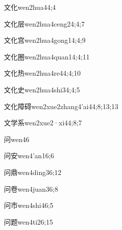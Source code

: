 \begin{verbete}{文化}{wen2hua4}{4;4}
\end{verbete}
\begin{verbete}{文化层}{wen2hua4ceng2}{4;4;7}
\end{verbete}
\begin{verbete}{文化宫}{wen2hua4gong1}{4;4;9}
\end{verbete}
\begin{verbete}{文化圈}{wen2hua4quan1}{4;4;11}
\end{verbete}
\begin{verbete}{文化热}{wen2hua4re4}{4;4;10}
\end{verbete}
\begin{verbete}{文化史}{wen2hua4shi3}{4;4;5}
\end{verbete}
\begin{verbete}{文化障碍}{wen2xue2zhang4'ai4}{4;8;13;13}
\end{verbete}
\begin{verbete}{文学系}{wen2xue2·xi4}{4;8;7}
\end{verbete}
\begin{verbete}{问}{wen4}{6}
\end{verbete}
\begin{verbete}{问安}{wen4'an1}{6;6}
\end{verbete}
\begin{verbete}{问鼎}{wen4ding3}{6;12}
\end{verbete}
\begin{verbete}{问卷}{wen4juan3}{6;8}
\end{verbete}
\begin{verbete}{问市}{wen4shi4}{6;5}
\end{verbete}
\begin{verbete}{问题}{wen4ti2}{6;15}
\end{verbete}

